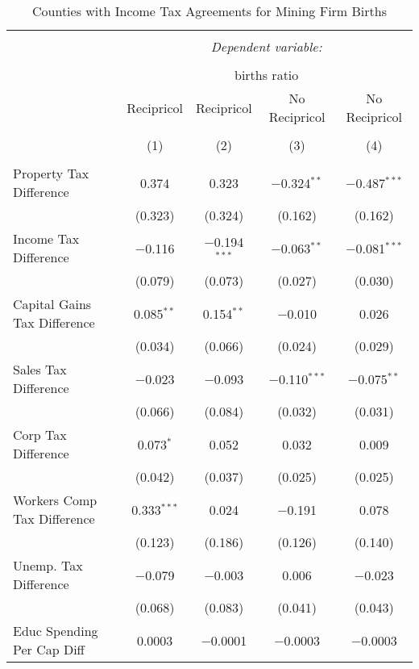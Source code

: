 
\begin{table}[!htbp] \centering 
  \caption{Counties with Income Tax Agreements for  Mining Firm Births} 
  \label{21agreement} 
\begin{tabular}{@{\extracolsep{5pt}}lcccc} 
\\[-1.8ex]\hline 
\hline \\[-1.8ex] 
 & \multicolumn{4}{c}{\textit{Dependent variable:}} \\ 
\cline{2-5} 
\\[-1.8ex] & \multicolumn{4}{c}{births ratio} \\ 
 & Recipricol & Recipricol & No Recipricol & No Recipricol \\ 
\\[-1.8ex] & (1) & (2) & (3) & (4)\\ 
\hline \\[-1.8ex] 
 Property Tax Difference & 0.374 & 0.323 & $-$0.324$^{**}$ & $-$0.487$^{***}$ \\ 
  & (0.323) & (0.324) & (0.162) & (0.162) \\ 
  Income Tax Difference & $-$0.116 & $-$0.194$^{***}$ & $-$0.063$^{**}$ & $-$0.081$^{***}$ \\ 
  & (0.079) & (0.073) & (0.027) & (0.030) \\ 
  Capital Gains Tax Difference & 0.085$^{**}$ & 0.154$^{**}$ & $-$0.010 & 0.026 \\ 
  & (0.034) & (0.066) & (0.024) & (0.029) \\ 
  Sales Tax Difference & $-$0.023 & $-$0.093 & $-$0.110$^{***}$ & $-$0.075$^{**}$ \\ 
  & (0.066) & (0.084) & (0.032) & (0.031) \\ 
  Corp Tax Difference & 0.073$^{*}$ & 0.052 & 0.032 & 0.009 \\ 
  & (0.042) & (0.037) & (0.025) & (0.025) \\ 
  Workers Comp Tax Difference & 0.333$^{***}$ & 0.024 & $-$0.191 & 0.078 \\ 
  & (0.123) & (0.186) & (0.126) & (0.140) \\ 
  Unemp. Tax Difference & $-$0.079 & $-$0.003 & 0.006 & $-$0.023 \\ 
  & (0.068) & (0.083) & (0.041) & (0.043) \\ 
  Educ Spending Per Cap Diff & 0.0003 & $-$0.0001 & $-$0.0003 & $-$0.0003 \\ 

\end{tabular}
\end{table}
